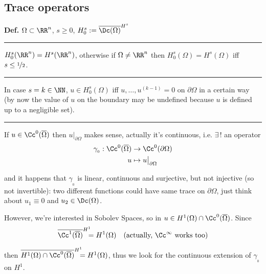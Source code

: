 \newpage


\subsection{\color{red}Trace operators}


\textbf{Def.} $\Omega\subset \RR^n$, $s\geq 0$, $H_0^s:=\overline{\Dc(\Omega)}^{H^s}$

\rule{0.31\textwidth}{0.2pt}
\smallskip

$H_0^s(\RR^n)=H^s(\RR^n)$, otherwise if $\Omega\neq\RR^n$ then $H_0^s(\Omega)=H^s(\Omega)$ iff $s\leq\nicefrac{1}{2}$.

\rule{0.31\textwidth}{0.2pt}
\smallskip

In case $s=k\in\NN$, $u\in H^s_0(\Omega)$ iff $u,\dots,u^{(k-1)}=0$ on $\partial\Omega$ in a certain way (by now the value of $u$ on the boundary may be undefined because $u$ is defined up to a negligible set).

\rule{0.31\textwidth}{0.2pt}
\smallskip

If $u\in\Cc^0(\overline{\Omega})$ then $u\big|_{\partial\Omega}$ makes sense, actually it's continuous, i.e. $\exists \,!$ an operator
\begin{align*}
\gamma_{_0}:\Cc^0(\overline{\Omega})&\to\Cc^0(\partial\Omega) \\
u&\mapsto u\big|_{\partial\Omega}
\end{align*}

and it happens that $\gamma_{_0}$ is linear, continuous and surjective, but not injective (so not invertible): two different functions could have same trace on $\partial\Omega$, just think about $u_1\equiv0$ and $u_2\in\Dc(\Omega)$.

\smallskip

However, we're interested in Sobolev Spaces, so in $u\in H^1(\Omega)\cap \Cc^0(\overline{\Omega})$. Since
\begin{equation*}
\overline{\Cc^1(\overline{\Omega})}^{H^1}\!\!\!\!=H^1(\Omega) \quad(\text{actually, }\Cc^\infty\text{ works too})
\end{equation*}

then $\overline{H^1(\Omega)\cap\Cc^0(\overline{\Omega})}^{H^1}\!\!\!\!=H^1(\Omega)$, thus we look for the continuous extension of $\gamma_{_0}$ on $H^1$. 

\begin{Figure}
\end{Figure}

